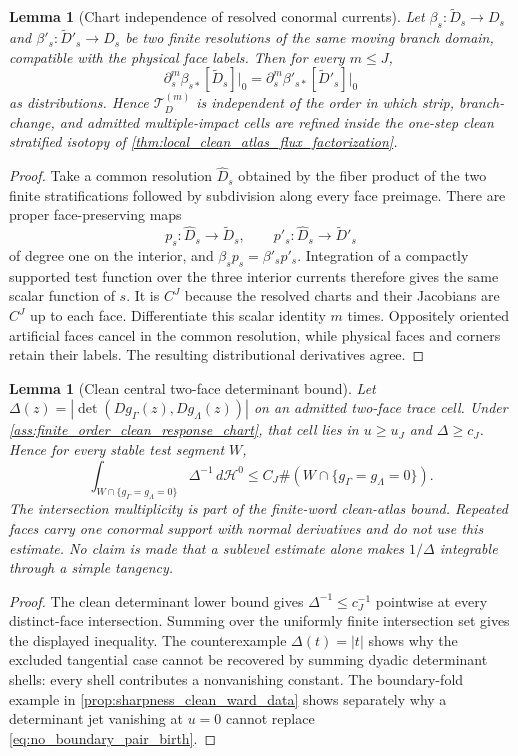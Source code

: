 \documentclass[11pt]{amsart}
\theoremstyle{compactplain}
\newtheorem{lemma}[theorem]{Lemma}
\newtheorem*{lemma*}{Lemma}
\theoremstyle{compactdefinition}
\theoremstyle{compactremark}
\begin{document}
\begin{lemma*}[Chart independence of resolved conormal currents]
Let \(\beta_s:\widetilde D_s\to D_s\) and
\(\beta'_s:\widetilde D'_s\to D_s\) be two finite resolutions of the same
moving branch domain, compatible with the physical face labels.  Then for
every \(m\le J\),
\[
  \partial_s^m\beta_{s*}[\widetilde D_s]\big|_0
  =
  \partial_s^m\beta'_{s*}[\widetilde D'_s]\big|_0
\]
as distributions.  Hence
\(\mathcal T_D^{(m)}\) is independent of the order in which strip,
branch-change, and admitted multiple-impact cells are refined inside the
one-step clean stratified isotopy of
\cref{thm:local_clean_atlas_flux_factorization}.
\end{lemma*}

\begin{proof}
Take a common resolution
\(\widehat D_s\) obtained by the fiber product of the two finite
stratifications followed by subdivision along every face preimage.  There are
proper face-preserving maps
\[
  p_s:\widehat D_s\to\widetilde D_s,\qquad
  p'_s:\widehat D_s\to\widetilde D'_s
\]
of degree one on the interior, and
\(\beta_s p_s=\beta'_sp'_s\).  Integration of a compactly supported test
function over the three interior currents therefore gives the same scalar
function of \(s\).  It is \(C^J\) because the resolved charts and their
Jacobians are \(C^J\) up to each face.  Differentiate this scalar identity
\(m\) times.  Oppositely oriented artificial faces cancel in the common
resolution, while physical faces and corners retain their labels.  The
resulting distributional derivatives agree.
\end{proof}

\begin{lemma}[Clean central two-face determinant bound]
\label{lem:clean_two_face_determinant_bound}
Let
\(\Delta(z)=|\det(Dg_\Gamma(z),Dg_\Lambda(z))|\) on an admitted two-face trace
cell.  Under \cref{ass:finite_order_clean_response_chart}, that cell lies in
\(u\ge u_J\) and \(\Delta\ge c_J\).  Hence for every stable test segment \(W\),
\[
  \int_{W\cap\{g_\Gamma=g_\Lambda=0\}}
  \Delta^{-1}\,d\mathcal H^0
  \le C_J
  \#(W\cap\{g_\Gamma=g_\Lambda=0\}).
\]
The intersection multiplicity is part of the finite-word clean-atlas bound.
Repeated faces carry one conormal support with normal derivatives and do not
use this estimate.  No claim is made that a sublevel estimate alone makes
\(1/\Delta\) integrable through a simple tangency.
\end{lemma}

\begin{proof}
The clean determinant lower bound gives \(\Delta^{-1}\le c_J^{-1}\)
pointwise at every distinct-face intersection.  Summing over the uniformly
finite intersection set gives the displayed inequality.  The counterexample
\(\Delta(t)=|t|\) shows why the excluded tangential case cannot be recovered
by summing dyadic determinant shells: every shell contributes a nonvanishing
constant.  The boundary-fold example in
\cref{prop:sharpness_clean_ward_data} shows separately why a determinant jet
vanishing at \(u=0\) cannot replace \eqref{eq:no_boundary_pair_birth}.
\end{proof}
\end{document}

